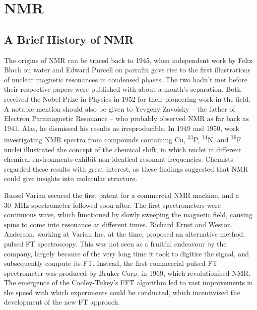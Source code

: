 \section{\acl{NMR}}

\subsection{A Brief History of NMR}
The origins of \ac{NMR} can be traced back to 1945, when independent work by
Felix Bloch on water\cite{Bloch1946} and Edward Purcell on
parrafin\cite{Purcell1946} gave rise to the first illustrations of nuclear
magnetic resonances in condensed phases. The two hadn't met before their
respective papers were published with about a month's
separation\cite{Becker1993}. Both received the Nobel Prize in Physics in 1952
for their pioneering work in the field. A notable mention should also be given
to Yevgeny Zavoisky -- the father of Electron Paramagnetic Resonance -- who
probably observed NMR as far back as 1941\cite{Eaton1998}. Alas, he dismissed
his results as irreproducible. In 1949 and 1950, work investigating \ac{NMR}
spectra from compounds containing Cu, \textsuperscript{31}P,
\textsuperscript{14}N, and \textsuperscript{19}F nuclei illustrated the concept
of the chemical shift\cite{Knight1949, Proctor1950, Dickinson1950}, in which
nuclei in different chemical environments exhibit non-identical resonant
frequencies.  Chemists regarded these results with great interest, as these
findings suggested that \ac{NMR} could give insights into molecular structure.

Russel Varian secured the first patent for a commercial \ac{NMR} machine, and a
\qty{30}{\mega\hertz} spectrometer followed soon after. The first spectrometers
were continuous wave, which functioned by slowly sweeping the magnetic field,
causing spins to come into resonance at different times. Richard Ernst and
Weston Anderson, working at Varian Inc. at the time, proposed an alternative
method: pulsed \ac{FT} spectroscopy\cite{Ernst1966}. This was not seen as a
fruitful endeavour by the company, largely because of the very long time it
took to digitise the signal, and subsequently compute its FT\cite{Freeman2015}.
Instead, the first commercial pulsed \ac{FT} spectrometer was produced by
Bruker Corp. in 1969, which revolutionised NMR. The emergence of the
Cooley-Tukey's \ac{FFT} algorithm\cite{Cooley1965} led to vast improvements in
the speed with which experiments could be conducted, which incentivised the
development of the new \ac{FT} approach.

